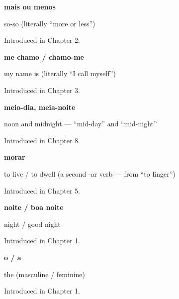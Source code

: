 \noindent\begin{minipage}[t]{\linewidth}
\raggedright
\textbf{mais ou menos}\par
\small so-so (literally \textquotedblleft{}more or less\textquotedblright{})\par
\footnotesize Introduced in Chapter 2.
\end{minipage}\par\medskip

\noindent\begin{minipage}[t]{\linewidth}
\raggedright
\textbf{me chamo / chamo-me}\par
\small my name is (literally \textquotedblleft{}I call myself\textquotedblright{})\par
\footnotesize Introduced in Chapter 3.
\end{minipage}\par\medskip

\noindent\begin{minipage}[t]{\linewidth}
\raggedright
\textbf{meio-dia, meia-noite}\par
\small noon and midnight — \textquotedblleft{}mid-day\textquotedblright{} and \textquotedblleft{}mid-night\textquotedblright{}\par
\footnotesize Introduced in Chapter 8.
\end{minipage}\par\medskip

\noindent\begin{minipage}[t]{\linewidth}
\raggedright
\textbf{morar}\par
\small to live / to dwell (a second -ar verb — from \textquotedblleft{}to linger\textquotedblright{})\par
\footnotesize Introduced in Chapter 5.
\end{minipage}\par\medskip

\noindent\begin{minipage}[t]{\linewidth}
\raggedright
\textbf{noite / boa noite}\par
\small night / good night\par
\footnotesize Introduced in Chapter 1.
\end{minipage}\par\medskip

\noindent\begin{minipage}[t]{\linewidth}
\raggedright
\textbf{o / a}\par
\small the (masculine / feminine)\par
\footnotesize Introduced in Chapter 1.
\end{minipage}\par\medskip

